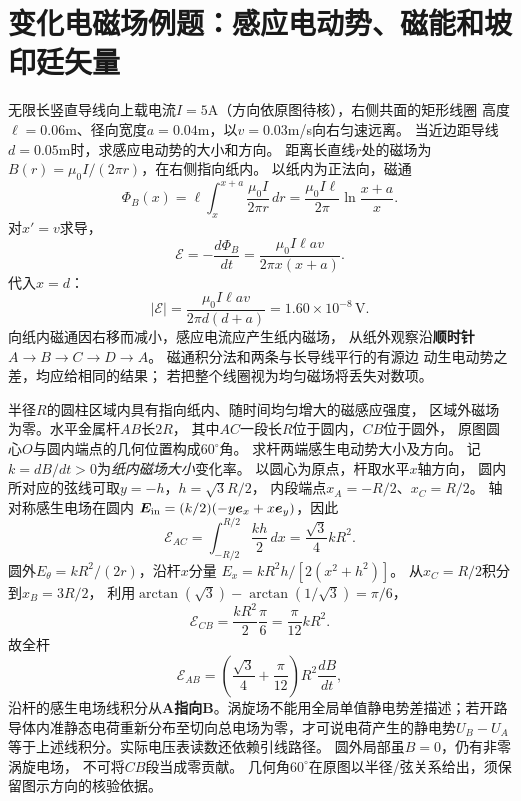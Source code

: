
\section*{变化电磁场例题：感应电动势、磁能和坡印廷矢量}

\problemtext 无限长竖直导线向上载电流$I=5$A（方向依原图待核），右侧共面的矩形线圈
高度$\ell=0.06$m、径向宽度$a=0.04$m，以$v=0.03$m/s向右匀速远离。
当近边距导线$d=0.05$m时，求感应电动势的大小和方向。
\workings
距离长直线$r$处的磁场为
$B(r)=\mu_0I/(2\pi r)$，在右侧指向纸内。
以纸内为正法向，磁通
\[
\Phi_B(x)=\ell\int_x^{x+a}\frac{\mu_0I}{2\pi r}\,dr
=\frac{\mu_0I\ell}{2\pi}\ln\frac{x+a}{x}.
\]
对$x'=v$求导，
\[
\mathcal E=-\frac{d\Phi_B}{dt}
=\frac{\mu_0I\ell av}{2\pi x(x+a)}.
\]
代入$x=d$：
\[
\boxed{|\mathcal E|=\frac{\mu_0I\ell av}{2\pi d(d+a)}
=1.60\times10^{-8}\,\mathrm V}.
\]
向纸内磁通因右移而减小，感应电流应产生纸内磁场，
从纸外观察沿\textbf{顺时针}$A\to B\to C\to D\to A$。
\crosscheck 磁通积分法和两条与长导线平行的有源边
动生电动势之差，均应给相同的结果；
若把整个线圈视为均匀磁场将丢失对数项。

\problemtext 半径$R$的圆柱区域内具有指向纸内、随时间均匀增大的磁感应强度，
区域外磁场为零。水平金属杆$AB$长$2R$，
其中$AC$一段长$R$位于圆内，$CB$位于圆外，
原图圆心$O$与圆内端点的几何位置构成$60^\circ$角。
求杆两端感生电动势大小及方向。
\workings
记$k=dB/dt>0$为\emph{纸内磁场大小}变化率。
以圆心为原点，杆取水平$x$轴方向，
圆内所对应的弦线可取$y=-h$，$h=\sqrt3R/2$，
内段端点$x_A=-R/2$、$x_C=R/2$。
轴对称感生电场在圆内
$\bm E_{\rm in}=(k/2)(-y\bm e_x+x\bm e_y)$，因此
\[
\mathcal E_{AC}=\int_{-R/2}^{R/2}\frac{kh}{2}\,dx
=\boxed{\frac{\sqrt3}{4}kR^2}.
\]
圆外$E_\theta=kR^2/(2r)$，沿杆$x$分量
$E_x=kR^2h/[2(x^2+h^2)]$。
从$x_C=R/2$积分到$x_B=3R/2$，
利用$\arctan(\sqrt3)-\arctan(1/\sqrt3)=\pi/6$，
\[
\mathcal E_{CB}
=\frac{kR^2}{2}\frac\pi6
=\boxed{\frac{\pi}{12}kR^2}.
\]
故全杆
\[
\boxed{\mathcal E_{AB}
=\left(\frac{\sqrt3}{4}+\frac{\pi}{12}\right)R^2\frac{dB}{dt}},
\]
沿杆的感生电场线积分从\textbf{A指向B}。涡旋场不能用全局单值静电势差描述；若开路导体内准静态电荷重新分布至切向总电场为零，才可说电荷产生的静电势$U_B-U_A$等于上述线积分。实际电压表读数还依赖引线路径。
\crosscheck 圆外局部虽$B=0$，仍有非零涡旋电场，
不可将$CB$段当成零贡献。
几何角$60^\circ$在原图以半径/弦关系给出，须保留图示方向的核验依据。

